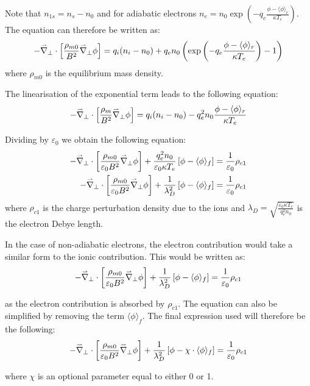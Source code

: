 Note that $n_{1s}=n_s-n_0$ and for adiabatic electrons $n_e=n_0 \exp\left(-q_e\frac{\phi-\langle \phi\rangle_r}{\kappa T_e}\right)$. The equation can therefore be written as:
\begin{equation}
 -\accentset{\rightharpoonup}{\nabla}_\perp\cdot\left[\frac{\rho_{m0}}{B^2}\accentset{\rightharpoonup}{\nabla}_\perp \phi\right] = q_i (n_i-n_0) + q_e n_0 \left(\exp\left(-q_e\frac{\phi-\langle \phi\rangle_r}{\kappa T_e}\right)-1\right)
\end{equation}
where $\rho_{m0}$ is the equilibrium mass density.

The linearisation of the exponential term leads to the following equation:
\begin{equation}
 -\accentset{\rightharpoonup}{\nabla}_\perp\cdot\left[\frac{\rho_m}{B^2}\accentset{\rightharpoonup}{\nabla}_\perp \phi\right] = q_i (n_i-n_0) - q_e^2 n_0 \frac{\phi-\langle \phi\rangle_r}{\kappa T_e}
\end{equation}

Dividing by $\varepsilon_0$ we obtain the following equation:
\begin{align}
 -\accentset{\rightharpoonup}{\nabla}_\perp\cdot\left[\frac{\rho_{m0}}{\varepsilon_0B^2}\accentset{\rightharpoonup}{\nabla}_\perp\phi\right] + \frac{q_e^2n_{0}}{\varepsilon_0\kappa T_e}\left[\phi-\langle\phi\rangle_f\right]=\frac{1}{\varepsilon_0}\rho_{c1}\\
 -\accentset{\rightharpoonup}{\nabla}_\perp\cdot\left[\frac{\rho_{m0}}{\varepsilon_0B^2}\accentset{\rightharpoonup}{\nabla}_\perp\phi\right] + \frac{1}{\lambda_D^2}\left[\phi-\langle\phi\rangle_f\right]=\frac{1}{\varepsilon_0}\rho_{c1}
\end{align}
where $\rho_{c1}$ is the charge perturbation density due to the ions and $\lambda_D=\sqrt{\frac{\varepsilon_0\kappa T_e}{q_e^2n_0}}$ is the electron Debye length.

In the case of non-adiabatic electrons, the electron contribution would take a similar form to the ionic contribution. This would be written as:
\begin{equation}
 -\accentset{\rightharpoonup}{\nabla}_\perp\cdot\left[\frac{\rho_{m0}}{\varepsilon_0B^2}\accentset{\rightharpoonup}{\nabla}_\perp\phi\right] + \frac{1}{\lambda_D^2}\left[\phi-\langle\phi\rangle_f\right]=\frac{1}{\varepsilon_0}\rho_{c1}
\end{equation}

as the electron contribution is absorbed by $\rho_{c1}$. The equation can also be simplified by removing the term $\langle\phi\rangle_f$. The final expression used will therefore be the following:
\begin{equation}\label{eq::quasi neutrality}
 -\accentset{\rightharpoonup}{\nabla}_\perp\cdot\left[\frac{\rho_{m0}}{\varepsilon_0B^2}\accentset{\rightharpoonup}{\nabla}_\perp\phi\right]+\frac{1}{\lambda_D^2}\left[\phi-\chi\cdot\langle\phi\rangle_f\right]=\frac{1}{\varepsilon_0}\rho_{c1}
\end{equation}

where $\chi$ is an optional parameter equal to either 0 or 1.